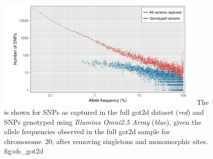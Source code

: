 

\begin{figure}[!htb]
\centering
\includegraphics[width=0.9\textwidth]{./img/ch2/sfs_got2d}
{The  is shown for SNPs as captured in the full \gls{got2d} dataset (\emph{red}) and SNPs genotyped using \emph{Illumina Omni2.5 Array} (\emph{blue}), given the allele frequencies observed in the full \gls{got2d} sample for chromosome~20, after removing singletons and monomorphic sites.}
{fig:sfs_got2d}
\end{figure}
